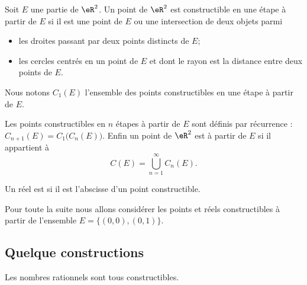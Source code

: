 \begin{definition}
    Soit \( E\) une partie de \( \eR^2\). Un point de \( \eR^2\) est constructible en une étape à partir de \( E\) si il est une point de \( E\) ou une intersection de deux objets parmi
    \begin{itemize}
        \item les droites passant par deux points distincts de \( E\);
        \item les cercles centrés en un point de \( E\) et dont le rayon est la distance entre deux points de \( E\).
    \end{itemize}
    Nous notons \( C_1(E)\) l'ensemble des points constructibles en une étape à partir de \( E\).

    Les points constructibles en \( n\) étapes à partir de \( E\) sont définis par récurrence : \( C_{n+1}(E)=C_1\big( C_n(E) \big)\). Enfin un point de \( \eR^2\) est  à partir de \( E\) si il appartient à
    \begin{equation}
        C(E)=\bigcup_{n=1}^{\infty}C_n(E).
    \end{equation}
    
    Un réel est  si il est l'abscisse d'un point constructible.
\end{definition}
Pour toute la suite nous allons considérer les points et réels constructibles à partir de l'ensemble \( E=\{ (0,0),(0,1) \}\).

\subsection{Quelque constructions}

\begin{proposition}  \label{PropIMFooDWAyoH}
    Les nombres rationnels sont tous constructibles.
\end{proposition}

